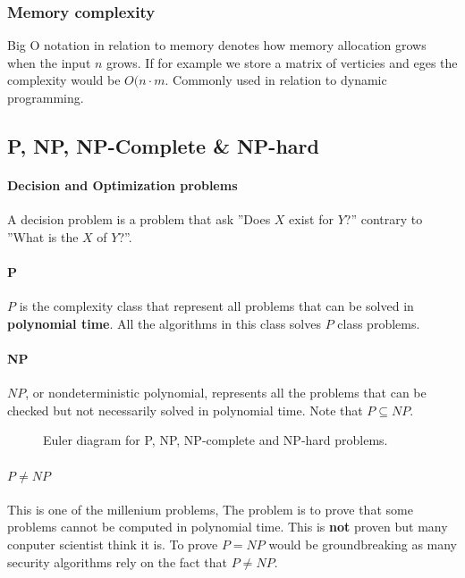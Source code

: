 \documentclass[12pt]{article} %
\begin{document}
\subsubsection{Memory complexity}
Big O notation in relation to memory denotes how memory allocation grows when the input $n$ grows. If for example we store a matrix of verticies and eges the complexity would be $O(n \cdot m$. Commonly used in relation to dynamic programming.

\subsection{P, NP, NP-Complete \& NP-hard}

\paragraph{Decision and Optimization problems}
A decision problem is a problem that ask ''Does $X$ exist for $Y$?'' contrary to ''What is the $X$ of $Y$?''.

\paragraph{P}
$P$ is the complexity class that represent all problems that can be solved in \textbf{polynomial time}. All the algorithms in this class solves $P$ class problems.

\paragraph{NP}
$NP$, or nondeterministic polynomial, represents all the problems that can be checked but not necessarily solved in polynomial time. Note that $P \subseteq NP$.

\begin{figure}[H]
\caption{Euler diagram for P, NP, NP-complete and NP-hard problems.}
\label{npProblems}
\end{figure} 

\paragraph{$P \neq NP$}
This is one of the millenium problems, The problem is to prove that some problems cannot be computed in polynomial time. This is \textbf{not} proven but many conputer scientist think it is. To prove $P = NP$ would be groundbreaking as many security algorithms rely on the fact that $P \neq NP$.
\end{document}
